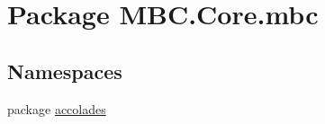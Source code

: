 \hypertarget{namespace_m_b_c_1_1_core_1_1mbc}{\section{Package M\-B\-C.\-Core.\-mbc}
\label{namespace_m_b_c_1_1_core_1_1mbc}
}
\subsection*{Namespaces}
\begin{DoxyCompactItemize}
\item 
package \hyperlink{namespace_m_b_c_1_1_core_1_1mbc_1_1accolades}{accolades}
\end{DoxyCompactItemize}
